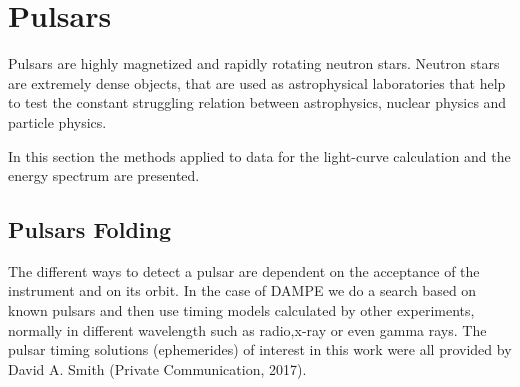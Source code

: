 \documentclass{PoS}
\begin{document}



\section{Pulsars}

Pulsars are highly magnetized and rapidly rotating neutron stars. Neutron stars are  extremely dense objects, that  are used as  astrophysical laboratories that help to test the constant struggling relation between astrophysics, nuclear physics  and particle physics. %

In this section the methods applied  to data for the light-curve calculation and the energy spectrum are presented.



\subsection{Pulsars Folding}
The different ways to detect a pulsar are dependent on the acceptance of the instrument and on its orbit. In the case of DAMPE we do a search based on known pulsars and  then use timing models calculated by other experiments, normally in different wavelength such as radio,x-ray or even gamma  rays. The pulsar timing solutions (ephemerides) of interest in this work were all provided by David A. Smith (Private Communication, 2017).

\end{document}
